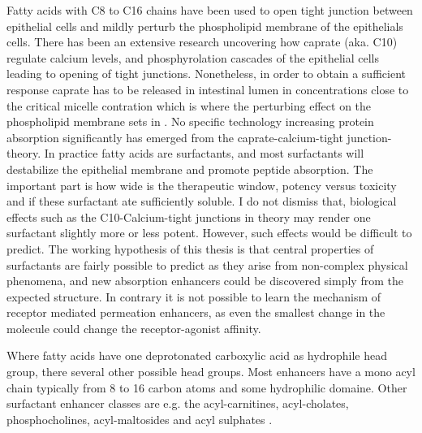 Fatty acids with C8 to C16 chains have been used to open tight junction between epithelial cells and mildly perturb the phospholipid membrane of the epithelials cells. There has been an extensive research \cite{bruno2013basics,maher2009safety,artursson1990epithelial} uncovering how caprate (aka. C10) regulate calcium levels, and phosphyrolation cascades of the epithelial cells leading to opening of tight junctions. Nonetheless, in order to obtain a sufficient response caprate has to be released in intestinal lumen in concentrations close to the critical micelle contration which is where the perturbing effect on the phospholipid membrane sets in \cite{bruno2013basics}. No specific technology increasing protein absorption significantly has emerged from the caprate-calcium-tight junction-theory. In practice fatty acids are surfactants, and most surfactants will destabilize the epithelial membrane and promote peptide absorption. The important part is how wide is the therapeutic window, potency versus toxicity and if these surfactant ate sufficiently soluble. I do not dismiss that, biological effects such as the C10-Calcium-tight junctions in theory may render one surfactant slightly more or less potent. However, such effects would be difficult to predict. The working hypothesis of this thesis is that central properties of surfactants are fairly possible to predict as they arise from non-complex physical phenomena, and new absorption enhancers could be discovered simply from the expected structure. In contrary it is not possible to learn the mechanism of receptor mediated permeation enhancers, as even the smallest change in the molecule could change the receptor-agonist affinity.

Where fatty acids have one deprotonated carboxylic acid as hydrophile head group, there several other possible head groups. Most enhancers have a mono acyl chain typically from 8 to 16 carbon atoms and some hydrophilic domaine. Other surfactant enhancer classes are e.g. the acyl-carnitines, acyl-cholates\cite{lee2000oral}, phosphocholines\cite{liu1999dodecylphosphocholine}, acyl-maltosides \cite{petersen2013colonic} and acyl sulphates \cite{anderberg1993epithelial}.

